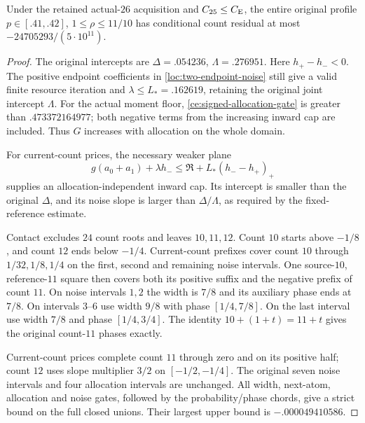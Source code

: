 \begin{lemma}\label{fc:low41}
Under the retained actual-$26$ acquisition and $C_{25}\le C_{\mathrm E}$,
the entire original profile $p\in[.41,.42]$, $1\le\rho\le11/10$
has conditional count residual at most $-24705293/(5\cdot10^{11})$.
\end{lemma}
\begin{proof}
The original intercepts are $\Delta=.054236$, $\Lambda=.276951$.
Here $h_+-h_-<0$. The positive endpoint coefficients in
\eqref{loc:two-endpoint-noise} still give a valid finite resource
iteration and $\lambda\le L_*=.162619$, retaining the original
joint intercept $\Lambda$. For the actual moment floor,
\eqref{ce:signed-allocation-gate} is greater than $.473372164977$;
both negative terms from the increasing inward cap are included.
Thus $G$ increases with allocation on the whole domain.

For current-count prices, the necessary weaker plane
\[
 g(a_0+a_1)+\lambda h_-
 \le\mathfrak R+L_*(h_--h_+)_+
\]
supplies an allocation-independent inward cap. Its intercept is
smaller than the original $\Delta$, and its noise slope is larger
than $\Delta/\Lambda$, as required by the fixed-reference estimate.

Contact excludes $24$ count roots and leaves $10,11,12$.
Count $10$ starts above $-1/8$, and count $12$ ends below $-1/4$.
Current-count prefixes cover count $10$ through $1/32,1/8,1/4$
on the first, second and remaining noise intervals.
One source-$10$, reference-$11$ square then covers both its
positive suffix and the negative prefix of count $11$.
On noise intervals $1,2$ the width is $7/8$ and its auxiliary
phase ends at $7/8$. On intervals $3$--$6$ use width $9/8$
with phase $[1/4,7/8]$. On the last interval use width $7/8$
and phase $[1/4,3/4]$. The identity $10+(1+t)=11+t$
gives the original count-$11$ phases exactly.

Current-count prices complete count $11$ through zero and on its
positive half; count $12$ uses slope multiplier $3/2$ on
$[-1/2,-1/4]$. The original seven noise intervals and four
allocation intervals are unchanged. All width, next-atom,
allocation and noise gates, followed by the probability/phase
chords, give a strict bound on the full closed unions.
Their largest upper bound is $-.000049410586$.
\end{proof}

